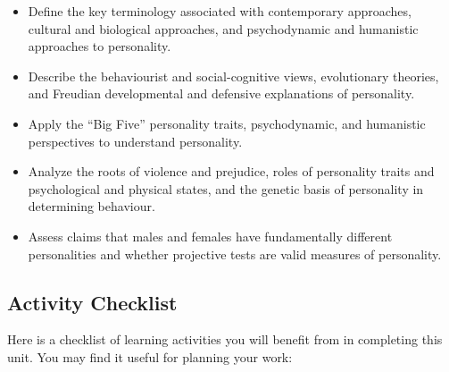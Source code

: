 \documentclass[
]{book}
\providecommand{\tightlist}{%
  \setlength{\itemsep}{0pt}\setlength{\parskip}{0pt}}
\begin{document}
\begin{itemize}
\tightlist
\item
  Define the key terminology associated with contemporary approaches, cultural and biological approaches, and psychodynamic and humanistic approaches to personality.\\
\item
  Describe the behaviourist and social-cognitive views, evolutionary theories, and Freudian developmental and defensive explanations of personality.\\
\item
  Apply the ``Big Five'' personality traits, psychodynamic, and humanistic perspectives to understand personality.\\
\item
  Analyze the roots of violence and prejudice, roles of personality traits and psychological and physical states, and the genetic basis of personality in determining behaviour.\\
\item
  Assess claims that males and females have fundamentally different personalities and whether projective tests are valid measures of personality.
\end{itemize}

\hypertarget{activity-checklist-3}{%
\subsection*{Activity Checklist}\label{activity-checklist-3}}

Here is a checklist of learning activities you will benefit from in completing this unit. You may find it useful for planning your work:
\end{document}
